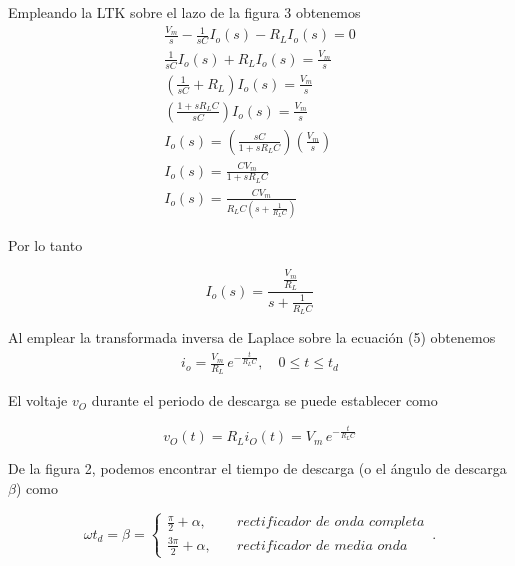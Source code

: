 \documentclass{article}
\begin{document}
\noindent Empleando la LTK sobre el lazo de la figura 3 obtenemos
\begin{align*}
	\frac{V_m}{s} - \frac{1}{sC}I_o(s) - R_LI_o(s) = 0\\
	\frac{1}{sC}I_o(s) +R_L I_o(s) = \frac{V_m}{s}\\
	\left( \frac{1}{sC} +R_L \right)I_o(s) = \frac{V_m}{s}\\
	\left( \frac{1 +sR_L C}{sC} \right)I_o(s) = \frac{V_m}{s}\\
	I_o(s) = \left( \frac{sC}{1 + sR_LC} \right) \left( \frac{V_m}{s} \right)\\
	I_o(s) = \frac{CV_m}{1 + sR_L C}\\
	I_o(s) = \frac{CV_m}{R_L C \left( s + \frac{1}{R_L C} \right)}
\end{align*}

\noindent Por lo tanto
\begin{tcolorbox}[colback=red!5!white,colframe=red!75!black,arc=0mm,boxrule=0mm,width=(\linewidth+0.5cm)]
	\begin{equation}
		I_o(s) = \frac{\frac{V_m}{R_L}}{s + \frac{1}{R_L C}}
	\end{equation}
\end{tcolorbox}

\noindent Al emplear la transformada inversa de Laplace sobre la ecuación (5) obtenemos
\begin{align}
	i_o = \frac{V_m}{R_L} \, e^{ -\frac{t}{R_L C} }, \quad  0 \leq t \leq t_d  
\end{align}

\noindent El voltaje $v_O$ durante el periodo de descarga se puede establecer como
\begin{tcolorbox}[colback=red!5!white,colframe=red!75!black,arc=0mm,boxrule=0mm,width=(\linewidth+0.5cm)]
	\begin{equation}
		v_O(t) = R_L i_O(t) = V_m \, e^{ -\frac{t}{R_L C} }
	\end{equation}
\end{tcolorbox}

\noindent De la figura 2, podemos encontrar el tiempo de descarga (o el ángulo de descarga $\beta$) como

\begin{equation}
	\omega t_d = \beta =  
	\begin{cases}
		\frac{\pi}{2} + \alpha, \quad & rectificador \,\, de \,\, onda \,\, completa\\
		\frac{3\pi}{2} + \alpha, \quad & rectificador \,\, de \,\, media \,\, onda
	\end{cases}\,.
\end{equation}
\end{document}

